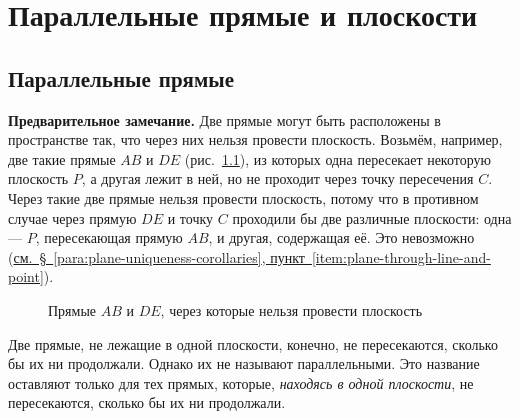 \chapter{Параллельные прямые и плоскости}\label{ch:ch3}

\begingroup
\setlength{\intextsep}{10pt plus 2pt minus 2pt}
\setlength{\textfloatsep}{12pt plus 2pt minus 2pt}

\newcommand*{\kiselevPlanimetryPage}[2]{%
    \href{https://commons.wikimedia.org/wiki/File:\%D0\%90._\%D0\%9F._\%D0\%9A\%D0\%B8\%D1\%81\%D0\%B5\%D0\%BB\%D1\%91\%D0\%B2._\%D0\%AD\%D0\%BB\%D0\%B5\%D0\%BC\%D0\%B5\%D0\%BD\%D1\%82\%D0\%B0\%D1\%80\%D0\%BD\%D0\%B0\%D1\%8F_\%D0\%B3\%D0\%B5\%D0\%BE\%D0\%BC\%D0\%B5\%D1\%82\%D1\%80\%D0\%B8\%D1\%8F_(1914).djvu?page=#1}{#2}%
}

\section*{Параллельные прямые}

 \textbf{Предварительное замечание.} Две прямые могут быть расположены в пространстве так, что через них нельзя провести плоскость. Возьмём, например, две такие прямые \(AB\) и \(DE\) (рис.~\ref{fig:kiselev-stereo-314}), из которых одна пересекает некоторую плоскость \(P\), а другая лежит в ней, но не проходит через точку пересечения \(C\). Через такие две прямые нельзя провести плоскость, потому что в противном случае через прямую \(DE\) и точку \(C\) проходили бы две различные плоскости: одна --- \(P\), пересекающая прямую \(AB\), и другая, содержащая её. Это невозможно (\hyperref[item:plane-through-line-and-point]{см.~§~\ref*{para:plane-uniqueness-corollaries}, пункт~\ref*{item:plane-through-line-and-point}}).

\begin{figure}[htbp]
    \centering
    \renewcommand{\thefigure}{314}
    \captionsetup{name=Рис.,labelsep=period}
    
    \caption{Прямые \(AB\) и \(DE\), через которые нельзя провести плоскость}\label{fig:kiselev-stereo-314}
\end{figure}

Две прямые, не лежащие в одной плоскости, конечно, не пересекаются, сколько бы их ни продолжали. Однако их не называют параллельными. Это название оставляют только для тех прямых, которые, \emph{находясь в одной плоскости}, не пересекаются, сколько бы их ни продолжали.

